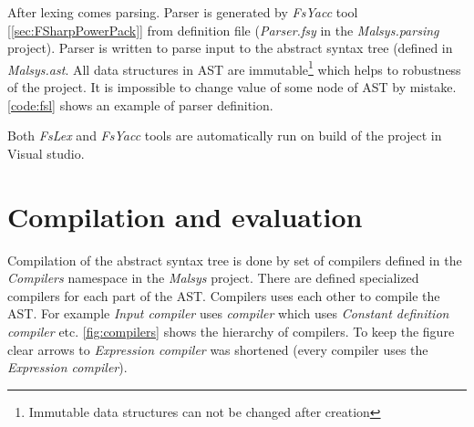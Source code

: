 After lexing comes parsing.
Parser is generated by \emph{FsYacc} tool [\ref{sec:FSharpPowerPack}] from definition file (\emph{Parser.fsy} in the \emph{Malsys.parsing} project).
Parser is written to parse input to the abstract syntax tree (defined in \emph{Malsys.ast}.
All data structures in AST are immutable\footnote{Immutable data structures can not be changed after creation} which helps to robustness of the project.
It is impossible to change value of some node of AST by mistake.
\autoref{code:fsl} shows an example of parser definition.


Both \emph{FsLex} and \emph{FsYacc} tools are automatically run on build of the project in Visual studio.


\section{Compilation and evaluation}

Compilation of the abstract syntax tree is done by set of compilers defined in the \emph{Compilers} namespace in the \emph{Malsys} project.
There are defined specialized compilers for each part of the AST.
Compilers uses each other to compile the AST.
For example \emph{Input compiler} uses \emph{\lsystem compiler} which uses \emph{Constant definition compiler} etc.
\autoref{fig:compilers} shows the hierarchy of compilers.
To keep the figure clear arrows to \emph{Expression compiler} was shortened (every compiler uses the \emph{Expression compiler}).

